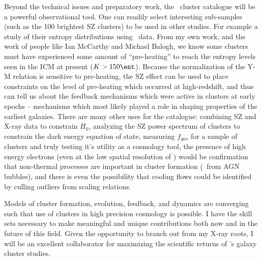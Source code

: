 \documentclass[11pt]{article}
\begin{document}
Beyond the technical issues and preparatory work, the \planck\ cluster
catalogue will be a powerful observational tool. One can readily
select interesting sub-samples (such as the 100 brightest SZ clusters)
to be used in other studies. For example a study of their entropy
distributions using \chandra\ data. From my own work, and the work of people
like Ian McCarthy and Michael Balogh, we know some clusters must have
experienced some amount of ``pre-heating'' to reach the entropy levels
seen in the ICM at present ($K > 150 \ent$). Because the normalization
of the Y-M relation is sensitive to pre-heating, the SZ effect can
be used to place constraints on the level of pre-heating which
occurred at high-redshift, and thus can tell us about the feedback
mechanisms which were active in clusters at early epochs -- mechanisms
which most likely played a role in shaping properties of the earliest
galaxies. There are many other uses for the catalogue: combining SZ
and X-ray data to constrain $H_0$, analyzing the SZ power spectrum of
clusters to constrain the dark energy equation of state, measuring
$f_{gas}$ for a sample of clusters and truly testing it's utility as a
cosmology tool, the presence of high energy electrons (even at the low
spatial resolution of \planck) would be confirmation that non-thermal
processes are important in cluster formation (\eg\ from AGN bubbles),
and there is even the possibility that cooling flows could be
identified by culling outliers from scaling relations.

Models of cluster formation, evolution, feedback, and dynamics are
converging such that use of clusters in high precision cosmology is
possible. I have the skill sets necessary to make meaningful and
unique contributions both now and in the future of this field. Given
the opportunity to branch out from my X-ray roots, I will be an
excellent collaborator for maximizing the scientific returns of
\planck's galaxy cluster studies.
\end{document}
